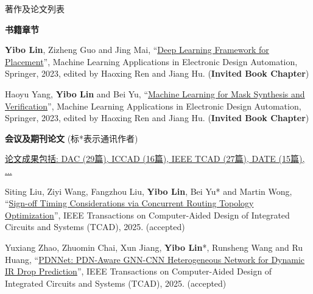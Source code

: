\begin{rSection}{著作及论文列表}



\textbf{书籍章节}
        

\begin{description}[font=\normalfont, rightmargin=2em]
    

\item[{[B3]}]{
        \textbf{Yibo Lin}, Zizheng Guo and Jing Mai, 
    ``\href{https://doi.org/10.1007/978-3-031-13074-8}{Deep Learning Framework for Placement}'', 
    Machine Learning Applications in Electronic Design Automation, Springer, 2023, edited by Haoxing Ren and Jiang Hu.
    (\textbf{Invited Book Chapter})
}
            

\item[{[B2]}]{
        Haoyu Yang, \textbf{Yibo Lin} and Bei Yu, 
    ``\href{https://doi.org/10.1007/978-3-031-13074-8}{Machine Learning for Mask Synthesis and Verification}'', 
    Machine Learning Applications in Electronic Design Automation, Springer, 2023, edited by Haoxing Ren and Jiang Hu.
    (\textbf{Invited Book Chapter})
}
            

\end{description}
    

\textbf{会议及期刊论文} (标*表示通讯作者)
        

            \underline{论文成果包括: DAC (29篇), ICCAD (16篇), IEEE TCAD (27篇), DATE (15篇), ...} 
    

\begin{description}[font=\normalfont, rightmargin=2em]
    

\item[{[J184]}]{
        Siting Liu, Ziyi Wang, Fangzhou Liu, \textbf{Yibo Lin}, Bei Yu* and Martin Wong, 
    ``\href{https://doi.org/10.1109/TCAD.2024.3506216}{Sign-off Timing Considerations via Concurrent Routing Topology Optimization}'', 
    IEEE Transactions on Computer-Aided Design of Integrated Circuits and Systems (TCAD), 2025.
    (accepted)
}
            

\item[{[J183]}]{
        Yuxiang Zhao, Zhuomin Chai, Xun Jiang, \textbf{Yibo Lin}*, Runsheng Wang and Ru Huang, 
    ``\href{https://doi.org/10.1109/TCAD.2024.3509796}{PDNNet: PDN-Aware GNN-CNN Heterogeneous Network for Dynamic IR Drop Prediction}'', 
    IEEE Transactions on Computer-Aided Design of Integrated Circuits and Systems (TCAD), 2025.
    (accepted)
}
            


\end{description}
\end{rSection}
